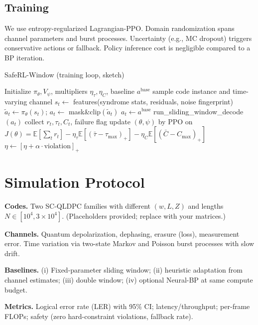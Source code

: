 \documentclass[conference]{IEEEtran}
\newcommand{\E}{\mathbb{E}}
\begin{document}
\subsection{Training}
We use entropy-regularized Lagrangian-PPO. Domain randomization spans channel parameters and burst processes. Uncertainty (e.g., MC dropout) triggers conservative actions or fallback. Policy inference cost is negligible compared to a BP iteration.

\begin{algorithm}[t]
\caption{SafeRL-Window (training loop, sketch)}
\begin{algorithmic}[1]
\State Initialize $\pi_\theta, V_\psi$, multipliers $\eta_\tau,\eta_C$, baseline $a^{\text{base}}$
  \State sample code instance and time-varying channel
    \State $s_t \gets$ features(syndrome stats, residuals, noise fingerprint)
    \State $\tilde a_t \gets \pi_\theta(s_t)$; $a_t \gets$ mask\&clip$(\tilde a_t)$
      \State $a_t \gets a^{\text{base}}$
    \EndIf
    \State run\_sliding\_window\_decode$(a_t)$
    \State collect $r_t, \tau_t, C_t$, failure flag
  \EndFor
  \State update $(\theta,\psi)$ by PPO on $J(\theta)=\E[\sum_t r_t]-\eta_\tau \E[(\bar\tau-\tau_{\max})_+]-\eta_C \E[(\bar C-C_{\max})_+]$
  \State $\eta \gets [\eta + \alpha \cdot \text{violation}]_+$
\EndFor
\end{algorithmic}
\end{algorithm}

\section{Simulation Protocol}
\textbf{Codes.} Two SC-QLDPC families with different $(w,L,Z)$ and lengths $N\!\in\![10^4,3{\times}10^4]$. (Placeholders provided; replace with your matrices.)

\textbf{Channels.} Quantum depolarization, dephasing, erasure (loss), measurement error. Time variation via two-state Markov and Poisson burst processes with slow drift.

\textbf{Baselines.} (i) Fixed-parameter sliding window; (ii) heuristic adaptation from channel estimates; (iii) double window; (iv) optional Neural-BP at same compute budget.

\textbf{Metrics.} Logical error rate (LER) with 95\% CI; latency/throughput; per-frame FLOPs; safety (zero hard-constraint violations, fallback rate).
\end{document}
